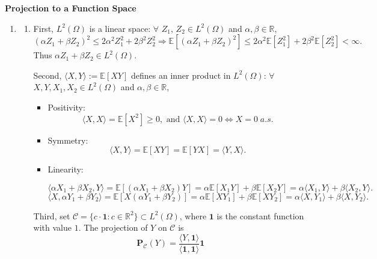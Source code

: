 \documentclass[11pt,letter,notitlepage]{article}
\begin{document}
\begin{solution} \textbf{Projection to a Function Space}
\begin{enumerate}
    \item 
    \begin{enumerate}
        \item 
        First, $L^2(\Omega)$ is a linear space: $\forall$ $Z_1$, $Z_2 \in L^2(\Omega)$ and $\alpha, \beta \in \mathbb{R}$,
        \[
        (\alpha Z_1 + \beta Z_2)^2
        \leq
        2\alpha^2 Z_1^2
        +
        2\beta^2 Z_2^2
        \Longrightarrow
        \mathbb{E}[(\alpha Z_1 + \beta Z_2)^2]
        \leq
        2\alpha^2 \mathbb{E}[Z_1^2]
        +
        2\beta^2 \mathbb{E}[Z_2^2]
        < \infty.
        \]
        Thus $\alpha Z_1 + \beta Z_2 \in L^2(\Omega)$.

        Second, $\langle X,Y \rangle:=\mathbb{E}[X Y]$ defines an inner product in $L^2(\Omega)$: $\forall$ $X, Y, X_1, X_2 \in L^2(\Omega)$ and $\alpha, \beta \in \mathbb{R}$,
        \begin{itemize}
            \item Positivity: 
            \[
            \langle X,X \rangle = \mathbb{E}[X^2] \geq 0, \text{ and } \langle X,X \rangle = 0 \Longleftrightarrow X=0\; a.s.
            \]
            \item Symmetry: 
            \[
            \langle X,Y \rangle = \mathbb{E}[X Y] = \mathbb{E}[Y X] = \langle Y,X \rangle.
            \]
            \item Linearity: 
            \begin{small}
            \[
            \langle \alpha X_1 + \beta X_2, Y \rangle = \mathbb{E}[(\alpha X_1 + \beta X_2) Y] = \alpha \mathbb{E}[X_1 Y] + \beta \mathbb{E}[X_2 Y] = \alpha \langle X_1, Y \rangle + \beta \langle X_2, Y \rangle.
            \]
            \[
            \langle X, \alpha Y_1 + \beta Y_2 \rangle = \mathbb{E}[X (\alpha Y_1 + \beta Y_2)] = \alpha \mathbb{E}[X Y_1] + \beta \mathbb{E}[X Y_2] = \alpha \langle X, Y_1 \rangle + \beta \langle X, Y_2 \rangle.
            \]
            \end{small}
        \end{itemize}
        Third, set $\mathcal{C} = \{c \cdot \mathbf{1}: c\in \mathbb{R}^2\} \subset L^2(\Omega)$, where $\mathbf{1}$ is the constant function with value $1$. The projection of $Y$ on $\mathcal{C}$ is
        \[
        \mathbf{P}_{\mathcal{C}}(Y)
        =
        \frac{\langle Y, \mathbf{1}\rangle}{\langle \mathbf{1}, \mathbf{1}\rangle} \mathbf{1}
\]
\end{enumerate}
\end{enumerate}
\end{solution}
\end{document}

